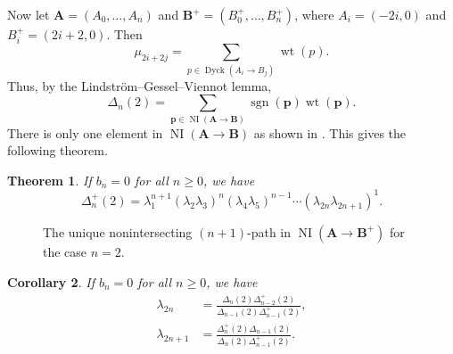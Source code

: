 \documentclass[oneside]{book}
\numberwithin{equation}{section}
\newtheorem{thm}{Theorem}[section]
\newtheorem{cor}[thm]{Corollary}
\theoremstyle{definition}
\newcommand\NI{\operatorname{NI}}
\newcommand\sgn{\operatorname{sgn}}
\newcommand{\Dyck}{\operatorname{Dyck}}
\newcommand\wt{\operatorname{wt}}
\renewcommand\vec[1]{\bm{#1}}
\newcommand\dlabel[3]{\node at (#1+0.7,#2-0.3) {\( #3 \)};}
\begin{document}
Now let \( \vec A = (A_0,\dots,A_n) \) and \( \vec B^+ = (B^+_0,\dots,B^+_n) \),
where \( A_i = (-2i,0) \) and \( B^+_i = (2i+2,0) \). Then
\[
  \mu_{2i+2j} = \sum_{p\in \Dyck(A_i\to B_j)} \wt(p). 
\]
Thus, by the Lindstr\"om--Gessel--Viennot lemma,
\[
  \Delta_n(2) = \sum_{\vec p \in \NI(\vec A \to \vec B)} \sgn(\vec p) \wt(\vec p).
\]
There is only one element in \( \NI(\vec A \to \vec B) \) as shown in
.
This gives the following theorem.
\begin{thm}\label{thm:12}
  If \( b_n=0 \) for all \( n\ge0 \), we have
\[
  \Delta^+_n(2) = \lambda_1^{n+1} (\lambda_2\lambda_3)^{n} (\lambda_4\lambda_5)^{n-1}
  \cdots  (\lambda_{2n}\lambda_{2n+1})^1.
\]
\end{thm}




\begin{figure}
  \centering
{}
\caption{The unique nonintersecting \( (n+1) \)-path in
  \( \NI(\vec A \to \vec B^+) \) for the case \( n=2 \).}
\label{fig:17}
\end{figure}


\begin{cor}\label{cor:5}
  If \( b_n=0 \) for all \( n\ge0 \), we have
  \begin{align*}
  \lambda_{2n} &= \frac{\Delta_n(2)\Delta^+_{n-2}(2)}{\Delta_{n-1}(2)\Delta^+_{n-1}(2)}, \\
  \lambda_{2n+1} &= \frac{\Delta^+_n(2)\Delta_{n-1}(2)}{\Delta_{n}(2)\Delta^+_{n-1}(2)}.
  \end{align*}
\end{cor}
\end{document}
